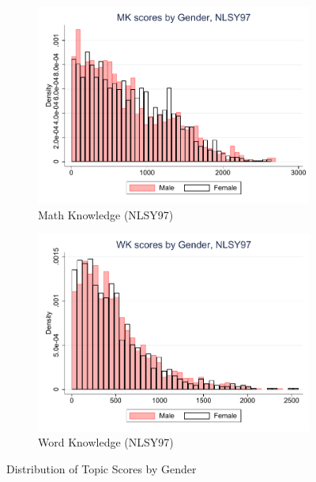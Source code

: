 \documentclass[onehalfspacing,11pt]{article}
\begin{document}
\begin{figure}
		\begin{subfigure}{0.49\textwidth}
		\includegraphics[width=\linewidth]{NLSY97_MK_gender.pdf}
		\caption{Math Knowledge (NLSY97)} \label{fig:nlsy97math}
	\end{subfigure}
	\hspace*{\fill} %
	\begin{subfigure}{0.49\textwidth}
		\includegraphics[width=\linewidth]{NLSY97_WK_gender.pdf}
		\caption{Word Knowledge (NLSY97)} \label{fig:nlsy97wprd}
	\end{subfigure}

	\caption{Distribution of Topic Scores by Gender}
	\label{fig:nlsy_by_gender}
\end{figure}
\end{document}
